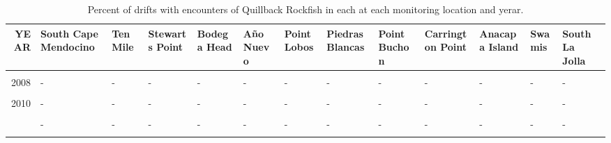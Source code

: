 \documentclass[
]{article}
\begin{document}
\begin{landscape}\begin{table}

\caption{\label{tab:unnamed-chunk-3}Percent of drifts with encounters of Quillback Rockfish in each at each monitoring location and yerar.}
\centering
\begin{tabular}[t]{r>{\raggedright\arraybackslash}p{1.7cm}>{\raggedright\arraybackslash}p{1.2cm}>{\raggedright\arraybackslash}p{1.2cm}>{\raggedright\arraybackslash}p{1.2cm}>{\raggedright\arraybackslash}p{1.2cm}>{\raggedright\arraybackslash}p{1.2cm}>{\raggedright\arraybackslash}p{1.2cm}>{\raggedright\arraybackslash}p{1.2cm}>{\raggedright\arraybackslash}p{1.2cm}>{\raggedright\arraybackslash}p{1.2cm}>{\raggedright\arraybackslash}p{1.2cm}l}
\toprule
YEAR & South Cape Mendocino & Ten Mile & Stewarts Point & Bodega Head & Año Nuevo & Point Lobos & Piedras Blancas & Point Buchon & Carrington Point & Anacapa Island & Swamis & South La Jolla\\
\midrule
\cellcolor{gray!6}{2007} & \cellcolor{gray!6}{-} & \cellcolor{gray!6}{-} & \cellcolor{gray!6}{-} & \cellcolor{gray!6}{-} & \cellcolor{gray!6}{-} & \cellcolor{gray!6}{-} & \cellcolor{gray!6}{-} & \cellcolor{gray!6}{-} & \cellcolor{gray!6}{-} & \cellcolor{gray!6}{-} & \cellcolor{gray!6}{-} & \cellcolor{gray!6}{-}\\
2008 & - & - & - & - & - & - & - & - & - & - & - & -\\
\cellcolor{gray!6}{2009} & \cellcolor{gray!6}{-} & \cellcolor{gray!6}{-} & \cellcolor{gray!6}{-} & \cellcolor{gray!6}{-} & \cellcolor{gray!6}{-} & \cellcolor{gray!6}{-} & \cellcolor{gray!6}{-} & \cellcolor{gray!6}{-} & \cellcolor{gray!6}{-} & \cellcolor{gray!6}{-} & \cellcolor{gray!6}{-} & \cellcolor{gray!6}{-}\\
2010 & - & - & - & - & - & - & - & - & - & - & - & -\\
\cellcolor{gray!6}{2011} & \cellcolor{gray!6}{-} & \cellcolor{gray!6}{-} & \cellcolor{gray!6}{-} & \cellcolor{gray!6}{-} & \cellcolor{gray!6}{-} & \cellcolor{gray!6}{-} & \cellcolor{gray!6}{-} & \cellcolor{gray!6}{-} & \cellcolor{gray!6}{-} & \cellcolor{gray!6}{-} & \cellcolor{gray!6}{-} & \cellcolor{gray!6}{-}\\
\addlinespace
2012 & - & - & - & - & - & - & - & - & - & - & - & -\\
\cellcolor{gray!6}{2013} & \cellcolor{gray!6}{-} & \cellcolor{gray!6}{-} & \cellcolor{gray!6}{-} & \cellcolor{gray!6}{-} & \cellcolor{gray!6}{-} & \cellcolor{gray!6}{-} & \cellcolor{gray!6}{-} & \cellcolor{gray!6}{-} & \cellcolor{gray!6}{-} & \cellcolor{gray!6}{-} & \cellcolor{gray!6}{-} & \cellcolor{gray!6}{-}\\

\end{tabular}
\end{table}
\end{landscape}
\end{document}
